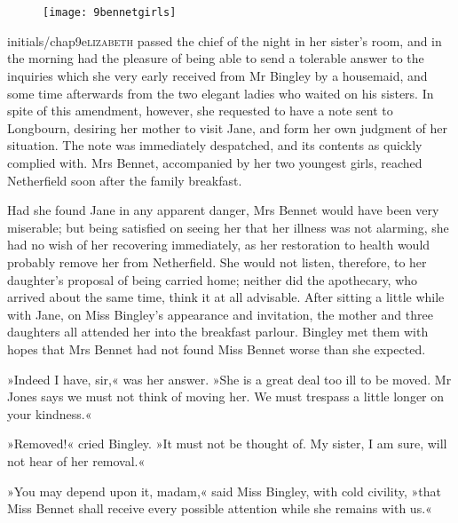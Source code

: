 
\chapter[Chapter \thechapter]{}
	
	\begin{figure}[t!]
\centering
\texttt{[image: 9bennetgirls]}
\end{figure}

	\lettrine[lines=6,image=true]{initials/chap9e}{lizabeth}  passed the chief of the night in her sister's room, and in the morning had the pleasure of being able to send a tolerable answer to the inquiries which she very early received from Mr Bingley by a housemaid, and some time afterwards from the two elegant ladies who waited on his sisters. In spite of this amendment, however, she requested to have a note sent to Longbourn, desiring her mother to visit Jane, and form her own judgment of her situation. The note was immediately despatched, and its contents as quickly complied with. Mrs Bennet, accompanied by her two youngest girls, reached Netherfield soon after the family breakfast.



Had she found Jane in any apparent danger, Mrs Bennet would have been very miserable; but being satisfied on seeing her that her illness was not alarming, she had no wish of her recovering immediately, as her restoration to health would probably remove her from Netherfield. She would not listen, therefore, to her daughter's proposal of being carried home; neither did the apothecary, who arrived about the same time, think it at all advisable. After sitting a little while with Jane, on Miss Bingley's appearance and invitation, the mother and three daughters all attended her into the breakfast parlour. Bingley met them with hopes that Mrs Bennet had not found Miss Bennet worse than she expected.

»Indeed I have, sir,« was her answer. »She is a great deal too ill to be moved. Mr Jones says we must not think of moving her. We must trespass a little longer on your kindness.«

»Removed!« cried Bingley. »It must not be thought of. My sister, I am sure, will not hear of her removal.«

»You may depend upon it, madam,« said Miss Bingley, with cold civility, »that Miss Bennet shall receive every possible attention while she remains with us.«

